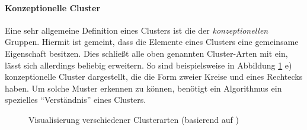 \paragraph{Konzeptionelle Cluster}
Eine sehr allgemeine Definition eines Clusters ist die der \textit{konzeptionellen} Gruppen. Hiermit ist
gemeint, dass die Elemente eines Clusters eine gemeinsame Eigenschaft besitzen. Dies schließt alle oben genannten
Cluster-Arten mit ein, lässt sich allerdings beliebig erweitern. So sind beispielsweise in Abbildung \ref{fig:basic_cluster_style} e)
konzeptionelle Cluster dargestellt, die die Form zweier Kreise und eines Rechtecks haben. Um solche Muster
erkennen zu können, benötigt ein Algorithmus ein spezielles ``Verständnis'' eines Clusters.

\begin{figure}[H]
    \centering
    \qquad
    \qquad
    \hfill
    \qquad
    \qquad
    \hfill
    \caption[Visualisierung verschiedener Clusterarten]{Visualisierung verschiedener Clusterarten (basierend auf \cite[]{tan2007introduction})}
    \label{fig:basic_cluster_style}
\end{figure}

